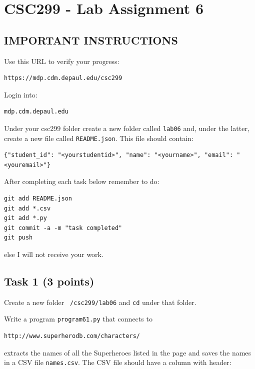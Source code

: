 \documentclass[12pt]{article}
\begin{document}
\section{CSC299 - Lab Assignment 6}

\subsection*{IMPORTANT INSTRUCTIONS}

\noindent Use this URL to verify your progress:
\begin{verbatim}
https://mdp.cdm.depaul.edu/csc299
\end{verbatim}

\noindent Login into:
\begin{verbatim}
mdp.cdm.depaul.edu
\end{verbatim}

\noindent Under your csc299 folder create a new folder called {\tt lab06} and, under the latter, create a new file called {\tt README.json}. This file should contain:

\begin{verbatim}
{"student_id": "<yourstudentid>", "name": "<yourname>", "email": "<youremail>"}
\end{verbatim}

\noindent After completing each task below remember to do:

\begin{verbatim}
git add README.json
git add *.csv
git add *.py
git commit -a -m "task completed"
git push
\end{verbatim}

\noindent  else I will not receive your work.

\subsection{Task 1 (3 points)}

\noindent  Create a new folder {\tt ~/csc299/lab06} and {\tt cd} under that folder.

\noindent Write a program {\tt program61.py} that connects to 

\begin{verbatim}
http://www.superherodb.com/characters/
\end{verbatim}

extracts the names of all the Superheroes listed in the page and
saves the names in a CSV file {\tt names.csv}. The CSV file should have a column with header:
\end{document}
